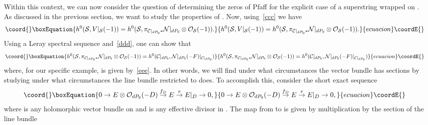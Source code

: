 \documentclass[a4paper,12pt]{article}
\numberwithin{equation}{section}
\theoremstyle{plain}
\begin{document}
Within this context, we can now consider the question of determining the
zeros
of Pfaff\coordHE{} for the explicit case of a superstring wrapped on
\coordHE{}. As discussed in the previous section, we want to study
the properties of \coordHE{}. Now,
using~\eqref{ccc}
we have
%
\begin{equation}\coord{}\boxEquation{
h^{0}({\cal S}, V|_{{\cal S}}(-1))=
h^{0}({\cal S}, \pi_{{\cal C}|_{dP_9}*}{\cal N}|_{dP_9}
\otimes {\cal O}_{{\cal S}}(-1)).
\label{burt}
}{
h^{0}({\cal S}, V|_{{\cal S}}(-1))=
h^{0}({\cal S}, \pi_{{\cal C}|_{dP_9}*}{\cal N}|_{dP_9}
\otimes {\cal O}_{{\cal S}}(-1)).
}{ecuacion}\coordE{}\end{equation}
%
Using a Leray spectral sequence and~\eqref{ddd}, one can show that
%
\begin{equation}\coord{}\boxEquation{
h^{0}({\cal S}, \pi_{{\cal C}|_{dP_9}*}{\cal N}|_{dP_9}
\otimes {\cal O}_{{\cal S}}(-1))=
h^{0} ({\cal C}|_{dP_9}, {\cal N}|_{dP_9}(-F)|_{{\cal C}|_{dP_9}})
\label{evgeny}
}{
h^{0}({\cal S}, \pi_{{\cal C}|_{dP_9}*}{\cal N}|_{dP_9}
\otimes {\cal O}_{{\cal S}}(-1))=
h^{0} ({\cal C}|_{dP_9}, {\cal N}|_{dP_9}(-F)|_{{\cal C}|_{dP_9}})
}{ecuacion}\coordE{}\end{equation}
%
where, for our specific example, \coordHE{} is given
by~\eqref{eee}. In other words, we will find under what circumstances
the vector bundle \coordHE{} has sections by studying under what
circumstances the line bundle \coordHE{} restricted
to \coordHE{} does. To accomplish this, consider the short exact
sequence
%
\begin{equation}\coord{}\boxEquation{
0 \rightarrow E \otimes {\cal O}_{dP_9} (-D) \stackrel{f_{D}}{\rightarrow}
E
\stackrel{r}{\rightarrow} E|_{D} \rightarrow 0,
\label{xxx}
}{
0 \rightarrow E \otimes {\cal O}_{dP_9} (-D) \stackrel{f_{D}}{\rightarrow}
E
\stackrel{r}{\rightarrow} E|_{D} \rightarrow 0,
}{ecuacion}\coordE{}\end{equation}
%
where \coordHE{} is any holomorphic vector bundle on \coordHE{} and \coordHE{} is any
effective
divisor in \coordHE{}. The map \coordHE{} from \coordHE{}
to \coordHE{} is given by multiplication by the section of the line bundle
\end{document}
